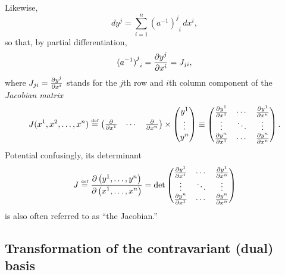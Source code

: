 Likewise,
\begin{equation}
d{ y }^j   =
\sum_{i=1}^n {{({a^{-1}})}^j}_i\, d{x}^i,
\end{equation}
so that, by partial differentiation,
\begin{equation}
{{(a^{-1})}^j}_i =
{\partial { y }^j \over \partial x^i}   =J_{ji},
\label{2001-mu-tensor-tl2nl}
\end{equation}
where $J_{ji} = {\partial { y }^j\over \partial {x}^i}$ stands for
the $j$th row and $i$th column component of the {\em Jacobian matrix}
\begin{equation}
J(x^1,x^2,\ldots ,x^n)
\stackrel{{\text{\tiny def}}}{=}
\begin{pmatrix}
\frac{\partial }{\partial { x }^1}&\cdots&\frac{\partial }{\partial {x}^n}
\end{pmatrix}
\times
\begin{pmatrix}
y^1\\
\vdots\\
y^n
\end{pmatrix}
\equiv
\begin{pmatrix}
{\partial { y }^1\over \partial {x}^1}&\cdots&{\partial { y }^1\over \partial {x}^n}\\
\vdots&\ddots &\vdots\\
{\partial { y }^n\over \partial {x}^1}&\cdots&{\partial { y }^n\over \partial {x}^n}
\end{pmatrix}
.
\label{2013-m-t-jm}
\end{equation}
Potential confusingly,
its determinant
\begin{equation}
J \stackrel{{\text{\tiny def}}}{=}
\frac{
\partial \begin{pmatrix}y^1, \ldots , y^n \end{pmatrix}
}
{
\partial \begin{pmatrix} x^1, \ldots , x^n \end{pmatrix}
}
=
\text{det}
\begin{pmatrix}
{\partial { y }^1\over \partial {x}^1}&\cdots&{\partial { y }^1\over \partial {x}^n}\\
\vdots&\ddots &\vdots\\
{\partial { y }^n\over \partial {x}^1}&\cdots&{\partial { y }^n\over \partial {x}^n}
\end{pmatrix}
\label{2018-mm-t-jd}
\end{equation}
is also often referred to as ``the Jacobian.''


\subsection{Transformation of the contravariant (dual) basis}

